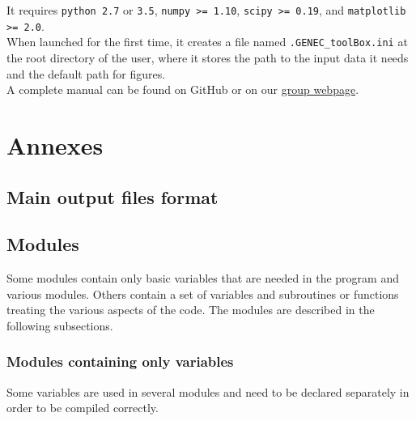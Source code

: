 \documentclass[11pt]{article}
\begin{document}
It requires {\tt python 2.7} or {\tt 3.5}, {\tt numpy >= 1.10}, {\tt scipy >= 0.19}, and {\tt matplotlib >= 2.0}.\\

When launched for the first time, it creates a file named {\tt .GENEC\_toolBox.ini} at the root directory of the user, where it stores the path to the input data it needs and the default path for figures.\\

A complete manual can be found on GitHub or on our \href{https://www.unige.ch/sciences/astro/evolution/en/database/tools/}{group webpage}.

\pagebreak

\section{Annexes}
\subsection{Main output files format}



\subsection{Modules\label{sMod}}
Some modules contain only basic variables that are needed in the program and various modules. Others contain a set of variables and subroutines or functions treating the various aspects of the code. The modules are described in the following subsections.

\subsubsection{Modules containing only variables}
Some variables are used in several modules and need to be declared separately in order to be compiled correctly. 
\end{document}
